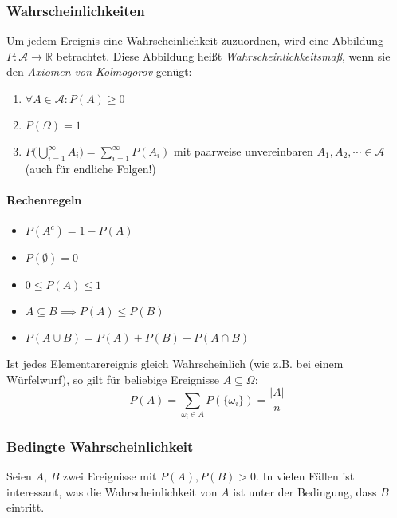 \documentclass[a4paper, 11pt, accentcolor = tud3b]{tudreport}
\newcommand{\abs}[1]{\ensuremath{{\lvert #1 \rvert}}}
\newcommand{\R}{\ensuremath{\mathbb{R}}}
\begin{document}
                \subsubsection{Wahrscheinlichkeiten}
	                Um jedem Ereignis eine Wahrscheinlichkeit zuzuordnen, wird eine Abbildung \( P : \mathcal{A} \rightarrow \R \) betrachtet. Diese Abbildung heißt \textit{Wahrscheinlichkeitsmaß}, wenn sie den \textit{Axiomen von Kolmogorov} genügt:
	                \begin{enumerate}
	                	\item \( \forall A \in \mathcal{A} : P(A) \geq 0 \)
	                	\item \( P(\Omega) = 1 \)
	                	\item \( P\Big( \bigcup_{i = 1}^\infty A_i \Big) = \sum_{i = 1}^{\infty} P(A_i) \) mit paarweise unvereinbaren \( A_1, A_2, \cdots \in \mathcal{A} \) (auch für endliche Folgen!)
	                \end{enumerate}
	                
	                \paragraph{Rechenregeln}
	                \begin{itemize}
	                	\item \( P(A^c) = 1 - P(A) \)
	                	\item \( P(\emptyset) = 0 \)
	                	\item \( 0 \leq P(A) \leq 1 \)
	                	\item \( A \subseteq B \implies P(A) \leq P(B) \)
	                	\item \( P(A \cup B) = P(A) + P(B) - P(A \cap B) \)
	                \end{itemize}
	                
	                Ist jedes Elementarereignis gleich Wahrscheinlich (wie z.B. bei einem Würfelwurf), so gilt für beliebige Ereignisse \( A \subseteq \Omega \):
	                \begin{equation*}
		                P(A) = \sum_{\omega_i \in A} P(\{ \omega_i \}) = \frac{\abs{A}}{n}
	                \end{equation*}

                \subsubsection{Bedingte Wahrscheinlichkeit}
                    Seien \(A\), \(B\) zwei Ereignisse mit \( P(A), P(B) > 0 \). In vielen Fällen ist interessant, was die Wahrscheinlichkeit von \(A\) ist unter der Bedingung, dass \(B\) eintritt.
                    
\end{document}
